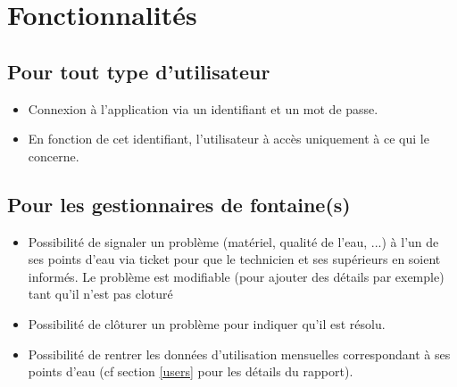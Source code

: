 \documentclass[a4paper, 11pt]{article}
\begin{document}
\section{Fonctionnalités}

\subsection{Pour tout type d'utilisateur}
\begin{itemize}
  \item Connexion à l'application via un identifiant et un mot de passe.
  \item En fonction de cet identifiant, l'utilisateur à accès uniquement à ce qui le concerne.
\end{itemize}

\subsection{Pour les gestionnaires de fontaine(s)}
\begin{itemize}
  \item Possibilité de signaler un problème (matériel, qualité de l'eau, ...) à l'un de ses points d'eau via ticket pour que le technicien et ses supérieurs en soient informés. Le problème est modifiable (pour ajouter des détails par exemple) tant qu'il n'est pas cloturé
  \item Possibilité de clôturer un problème pour indiquer qu'il est résolu.
  \item Possibilité de rentrer les données d'utilisation mensuelles correspondant à ses points d'eau (cf section \ref{users} pour les détails du rapport).
\end{itemize}

\end{document}
